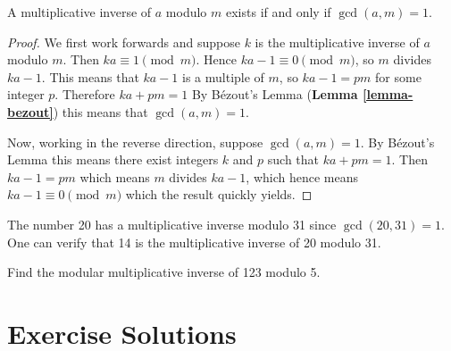 \begin{proposition}\label{prop-multiplicative-inverse-exists-iff-coprime}
    A multiplicative inverse of $a$ modulo $m$ exists if and only if $\gcd(a,m) = 1$.
\end{proposition}
\begin{proof}
    We first work forwards and suppose $k$ is the multiplicative inverse of $a$ modulo $m$. Then $ka \equiv 1 \pmod m$. Hence $ka - 1 \equiv 0 \pmod m$, so $m$ divides $ka - 1$. This means that $ka - 1$ is a multiple of $m$, so $ka - 1 = pm$ for some integer $p$. Therefore $ka + pm = 1$ By B\'{e}zout's Lemma (\textbf{Lemma \ref{lemma-bezout}}) this means that $\gcd(a, m) = 1$.
    
    Now, working in the reverse direction, suppose $\gcd(a, m) = 1$. By B\'{e}zout's Lemma this means there exist integers $k$ and $p$ such that $ka + pm = 1$. Then $ka - 1 = pm$ which means $m$ divides $ka - 1$, which hence means $ka - 1 \equiv 0 \pmod m$ which the result quickly yields.
\end{proof}

\begin{example}
    The number 20 has a multiplicative inverse modulo 31 since $\gcd(20, 31) = 1$. One can verify that 14 is the multiplicative inverse of 20 modulo 31.
\end{example}

\begin{exercise}
    Find the modular multiplicative inverse of 123 modulo 5.
\end{exercise}

\appendix
\chapter{Exercise Solutions}

